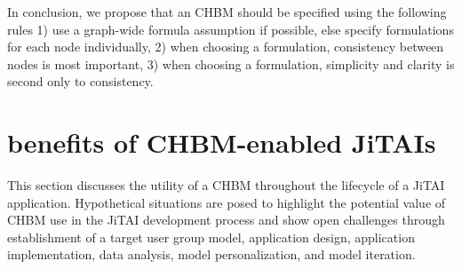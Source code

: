 \documentclass[runningheads,a4paper]{llncs}
\begin{document}
In conclusion, we propose that an CHBM should be specified using the following rules 1) use a graph-wide formula assumption if possible, else specify formulations for each node individually, 2) when choosing a formulation, consistency between nodes is most important, 3) when choosing a formulation, simplicity and clarity is second only to consistency.
  



\section{benefits of CHBM-enabled JiTAIs}
This section discusses the utility of a CHBM throughout the lifecycle of a JiTAI application.
Hypothetical situations are posed to highlight the potential value of CHBM use in the JiTAI development process and show open challenges through establishment of a target user group model, application design, application implementation, data analysis, model personalization, and model iteration.
\end{document}
